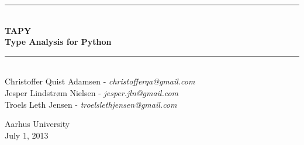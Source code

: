 \documentclass[a4paper,english, oneside, 12pt]{memoir} %
\numberwithin{equation}{section}
\begin{document}
\frontmatter
\begin{titlingpage}

\centering \parindent=0pt
\newcommand{\HRule}{\rule{\textwidth}{1mm}}
 \HRule\\[1cm]
\Huge\bfseries TAPY\\[0.7cm]
\large Type Analysis for Python \\[1cm]
\HRule\\[2cm] 
\large Christoffer Quist Adamsen - \textit{christofferqa@gmail.com} \\
\large Jesper Lindstr\o m Nielsen - \textit{jesper.jln@gmail.com} \\
\large Troels Leth Jensen - \textit{troelslethjensen@gmail.com} \\

\vspace*{2 cm}  \normalsize 

\begin{flushleft}
Aarhus University\\
July 1, 2013 \end{flushleft}




\end{titlingpage}


\mainmatter










\backmatter

\appendix


\end{document}
